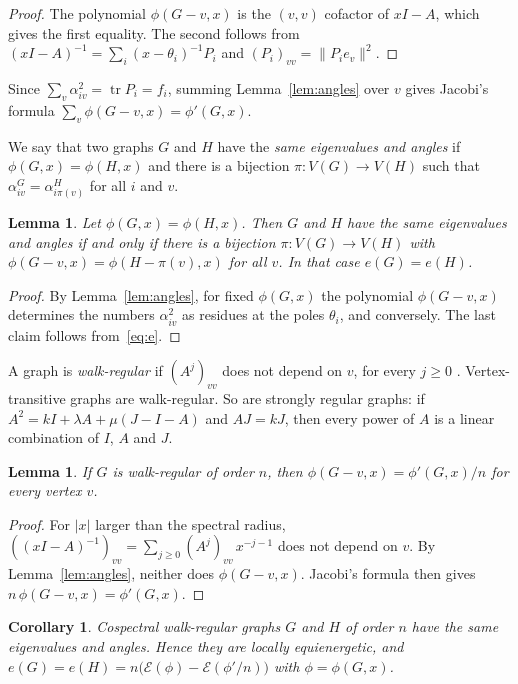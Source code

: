 \documentclass[11pt]{amsart}
\newtheorem{lemma}[theorem]{Lemma}
\newtheorem{corollary}[theorem]{Corollary}
\theoremstyle{remark}
\newcommand{\cE}{\mathcal{E}}
\DeclareMathOperator{\tr}{tr}
\begin{document}
\begin{proof}
The polynomial $\phi(G-v,x)$ is the $(v,v)$ cofactor of $xI-A$, which gives the first equality.
The second follows from $(xI-A)^{-1}=\sum_i(x-\theta_i)^{-1}P_i$ and $(P_i)_{vv}=\|P_ie_v\|^2$.
\end{proof}

Since $\sum_v\alpha_{iv}^2=\tr P_i=f_i$, summing Lemma~\ref{lem:angles} over $v$ gives Jacobi's formula $\sum_v\phi(G-v,x)=\phi'(G,x)$.

We say that two graphs $G$ and $H$ have the \emph{same eigenvalues and angles} if $\phi(G,x)=\phi(H,x)$ and there is a bijection $\pi\colon V(G)\to V(H)$ such that $\alpha^G_{iv}=\alpha^H_{i\pi(v)}$ for all $i$ and $v$.

\begin{lemma}\label{lem:deck}
Let $\phi(G,x)=\phi(H,x)$.
Then $G$ and $H$ have the same eigenvalues and angles if and only if there is a bijection $\pi\colon V(G)\to V(H)$ with $\phi(G-v,x)=\phi(H-\pi(v),x)$ for all $v$.
In that case $e(G)=e(H)$.
\end{lemma}

\begin{proof}
By Lemma~\ref{lem:angles}, for fixed $\phi(G,x)$ the polynomial $\phi(G-v,x)$ determines the numbers $\alpha_{iv}^2$ as residues at the poles $\theta_i$, and conversely.
The last claim follows from~\eqref{eq:e}.
\end{proof}

A graph is \emph{walk-regular} if $(A^j)_{vv}$ does not depend on $v$, for every $j\ge0$ \cite{GM80}.
Vertex-transitive graphs are walk-regular.
So are strongly regular graphs: if $A^2=kI+\lambda A+\mu(J-I-A)$ and $AJ=kJ$, then every power of $A$ is a linear combination of $I$, $A$ and $J$.

\begin{lemma}\label{lem:walk}
If $G$ is walk-regular of order $n$, then $\phi(G-v,x)=\phi'(G,x)/n$ for every vertex $v$.
\end{lemma}

\begin{proof}
For $|x|$ larger than the spectral radius, $((xI-A)^{-1})_{vv}=\sum_{j\ge0}(A^j)_{vv}\,x^{-j-1}$ does not depend on $v$.
By Lemma~\ref{lem:angles}, neither does $\phi(G-v,x)$.
Jacobi's formula then gives $n\,\phi(G-v,x)=\phi'(G,x)$.
\end{proof}

\begin{corollary}\label{cor:walk}
Cospectral walk-regular graphs $G$ and $H$ of order $n$ have the same eigenvalues and angles.
Hence they are locally equienergetic, and $e(G)=e(H)=n\bigl(\cE(\phi)-\cE(\phi'/n)\bigr)$ with $\phi=\phi(G,x)$.
\end{corollary}
\end{document}
